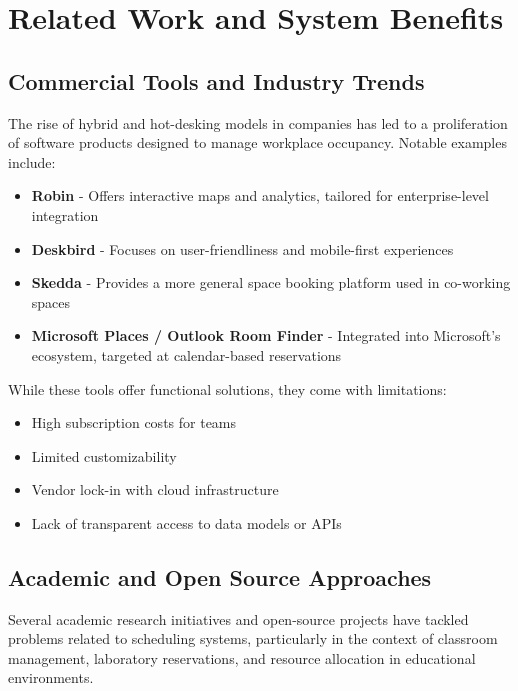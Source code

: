 \documentclass[12pt,a4paper]{report} %
\begin{document}
\newpage

\chapter{Related Work and System Benefits}

\section{Commercial Tools and Industry Trends}

The rise of hybrid and hot-desking models in companies has led to a proliferation of software products designed to manage workplace occupancy. Notable examples include:
\begin{itemize}
    \item \textbf{Robin} - Offers interactive maps and analytics, tailored for enterprise-level integration
    \item \textbf{Deskbird} - Focuses on user-friendliness and mobile-first experiences
    \item \textbf{Skedda} - Provides a more general space booking platform used in co-working spaces
    \item \textbf{Microsoft Places / Outlook Room Finder} - Integrated into Microsoft's ecosystem, targeted at calendar-based reservations
\end{itemize}

While these tools offer functional solutions, they come with limitations:
\begin{itemize}
    \item High subscription costs for teams
    \item Limited customizability
    \item Vendor lock-in with cloud infrastructure
    \item Lack of transparent access to data models or APIs
\end{itemize}

\section{Academic and Open Source Approaches}

Several academic research initiatives and open-source projects have tackled problems related to scheduling systems, particularly in the context of classroom management, laboratory reservations, and resource allocation in educational environments.

\end{document}
